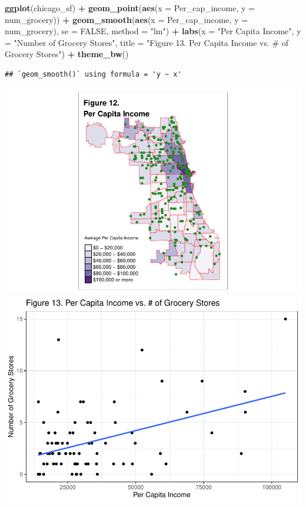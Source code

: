 \documentclass[
]{article}
\newenvironment{Shaded}{\begin{snugshade}}{\end{snugshade}}
\newcommand{\AttributeTok}[1]{\textcolor[rgb]{0.13,0.29,0.53}{#1}}
\newcommand{\ConstantTok}[1]{\textcolor[rgb]{0.56,0.35,0.01}{#1}}
\newcommand{\FunctionTok}[1]{\textcolor[rgb]{0.13,0.29,0.53}{\textbf{#1}}}
\newcommand{\NormalTok}[1]{#1}
\newcommand{\SpecialCharTok}[1]{\textcolor[rgb]{0.81,0.36,0.00}{\textbf{#1}}}
\newcommand{\StringTok}[1]{\textcolor[rgb]{0.31,0.60,0.02}{#1}}
\begin{document}
\begin{Shaded}
\begin{Highlighting}[]
\FunctionTok{ggplot}\NormalTok{(chicago\_sf) }\SpecialCharTok{+}
  \FunctionTok{geom\_point}\NormalTok{(}\FunctionTok{aes}\NormalTok{(}\AttributeTok{x =}\NormalTok{ Per\_cap\_income, }\AttributeTok{y =}\NormalTok{ num\_grocery)) }\SpecialCharTok{+}
  \FunctionTok{geom\_smooth}\NormalTok{(}\FunctionTok{aes}\NormalTok{(}\AttributeTok{x =}\NormalTok{ Per\_cap\_income, }\AttributeTok{y =}\NormalTok{ num\_grocery), }\AttributeTok{se =} \ConstantTok{FALSE}\NormalTok{, }\AttributeTok{method =} \StringTok{"lm"}\NormalTok{) }\SpecialCharTok{+}
  \FunctionTok{labs}\NormalTok{(}\AttributeTok{x =} \StringTok{"Per Capita Income"}\NormalTok{,}
       \AttributeTok{y =} \StringTok{"Number of Grocery Stores"}\NormalTok{,}
       \AttributeTok{title =} \StringTok{"Figure 13. Per Capita Income vs. \# of Grocery Stores"}\NormalTok{) }\SpecialCharTok{+}
  \FunctionTok{theme\_bw}\NormalTok{()}
\end{Highlighting}
\end{Shaded}

\begin{verbatim}
## `geom_smooth()` using formula = 'y ~ x'
\end{verbatim}

\includegraphics[width=0.5\linewidth]{Sam-Song_Coding-Sample_files/figure-latex/unnamed-chunk-12-1}
\includegraphics[width=0.5\linewidth]{Sam-Song_Coding-Sample_files/figure-latex/unnamed-chunk-12-2}
\end{document}
